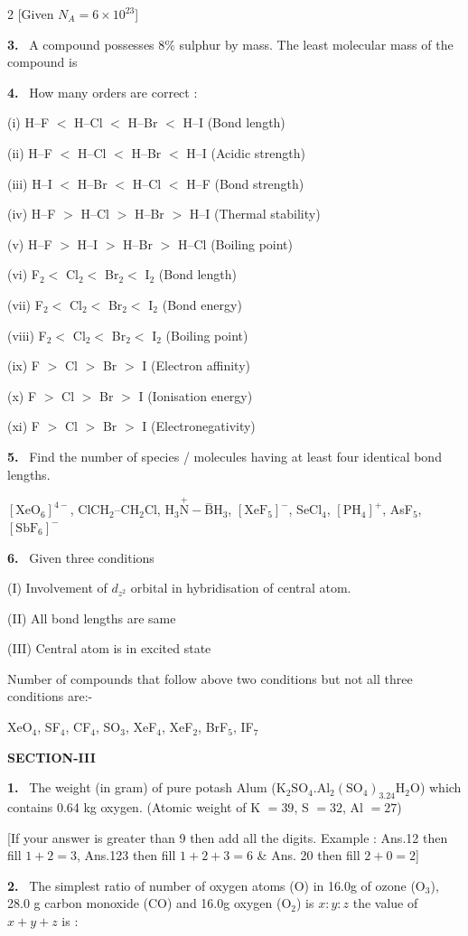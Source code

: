 \documentclass[10pt]{extarticle}
\newcommand{\sect}[1]{\par\smallskip\noindent\textbf{#1}\par}
\newcommand{\qn}[1]{\par\smallskip\noindent\textbf{#1.}~}
\begin{document}
\begin{multicols}{2}
[Given $N_A=6\times10^{23}$]
\qn{3} A compound possesses 8\% sulphur by mass. The least molecular mass of the compound is
\qn{4} How many orders are correct :

(i) H--F $<$ H--Cl $<$ H--Br $<$ H--I (Bond length)

(ii) H--F $<$ H--Cl $<$ H--Br $<$ H--I (Acidic strength)

(iii) H--I $<$ H--Br $<$ H--Cl $<$ H--F (Bond strength)

(iv) H--F $>$ H--Cl $>$ H--Br $>$ H--I (Thermal stability)

(v) H--F $>$ H--I $>$ H--Br $>$ H--Cl (Boiling point)

(vi) F$_2<$ Cl$_2<$ Br$_2<$ I$_2$ (Bond length)

(vii) F$_2<$ Cl$_2<$ Br$_2<$ I$_2$ (Bond energy)

(viii) F$_2<$ Cl$_2<$ Br$_2<$ I$_2$ (Boiling point)

(ix) F $>$ Cl $>$ Br $>$ I (Electron affinity)

(x) F $>$ Cl $>$ Br $>$ I (Ionisation energy)

(xi) F $>$ Cl $>$ Br $>$ I (Electronegativity)
\qn{5} Find the number of species / molecules having at least four identical bond lengths.

$[\mathrm{XeO_6}]^{4-}$, ClCH$_2$--CH$_2$Cl, H$_3\overset{+}{\mathrm N}-\overset{-}{\mathrm B}$H$_3$, $[\mathrm{XeF_5}]^-$, SeCl$_4$, $[\mathrm{PH_4}]^+$, AsF$_5$, $[\mathrm{SbF_6}]^-$
\qn{6} Given three conditions

(I) Involvement of $d_{z^2}$ orbital in hybridisation of central atom.

(II) All bond lengths are same

(III) Central atom is in excited state

Number of compounds that follow above two conditions but not all three conditions are:-

XeO$_4$, SF$_4$, CF$_4$, SO$_3$, XeF$_4$, XeF$_2$, BrF$_5$, IF$_7$
\sect{SECTION-III}
\qn{1} The weight (in gram) of pure potash Alum ($\mathrm{K_2SO_4.Al_2(SO_4)_3.24H_2O}$) which contains 0.64 kg oxygen. (Atomic weight of K $=39$, S $=32$, Al $=27$)

[If your answer is greater than 9 then add all the digits. Example : Ans.12 then fill $1+2=3$, Ans.123 then fill $1+2+3=6$ \& Ans. 20 then fill $2+0=2$]
\qn{2} The simplest ratio of number of oxygen atoms (O) in 16.0g of ozone (O$_3$), 28.0 g carbon monoxide (CO) and 16.0g oxygen (O$_2$) is $x:y:z$ the value of $x+y+z$ is :


\end{multicols}
\end{document}
